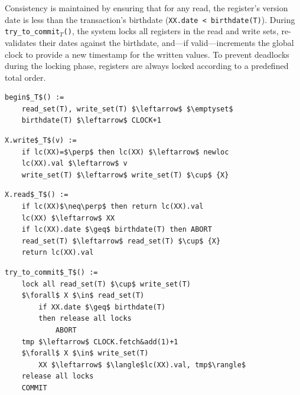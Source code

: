 Consistency is maintained by ensuring that for any read, the register's version date is less than the transaction's birthdate (\texttt{XX.date < birthdate(T)}). During \texttt{try\_to\_commit}$_T$\texttt{()}, the system locks all registers in the read and write sets, re-validates their dates against the birthdate, and—if valid—increments the global clock to provide a new timestamp for the written values. To prevent deadlocks during the locking phase, registers are always locked according to a predefined total order.

\begin{minipage}{\textwidth}
\begin{minipage}{0.45\textwidth}
\begin{lstlisting}[mathescape]
begin$_T$() :=
    read_set(T), write_set(T) $\leftarrow$ $\emptyset$
    birthdate(T) $\leftarrow$ CLOCK+1
\end{lstlisting}
\end{minipage}
\hfill
\begin{minipage}{0.45\textwidth}
\begin{lstlisting}[mathescape]
X.write$_T$(v) :=
    if lc(XX)=$\perp$ then lc(XX) $\leftarrow$ newloc
    lc(XX).val $\leftarrow$ v
    write_set(T) $\leftarrow$ write_set(T) $\cup$ {X}
\end{lstlisting}
\end{minipage}
\begin{minipage}{0.45\textwidth}
\begin{lstlisting}[mathescape]
X.read$_T$() :=
    if lc(XX)$\neq\perp$ then return lc(XX).val
    lc(XX) $\leftarrow$ XX
    if lc(XX).date $\geq$ birthdate(T) then ABORT
    read_set(T) $\leftarrow$ read_set(T) $\cup$ {X}
    return lc(XX).val
\end{lstlisting}
\end{minipage}
\hfill
\begin{minipage}{0.45\textwidth}
\begin{lstlisting}[mathescape]
try_to_commit$_T$() :=
    lock all read_set(T) $\cup$ write_set(T)
    $\forall$ X $\in$ read_set(T)
        if XX.date $\geq$ birthdate(T)
        then release all locks
            ABORT
    tmp $\leftarrow$ CLOCK.fetch&add(1)+1
    $\forall$ X $\in$ write_set(T)
        XX $\leftarrow$ $\langle$lc(XX).val, tmp$\rangle$
    release all locks
    COMMIT
\end{lstlisting}
\end{minipage}
\end{minipage}\\

